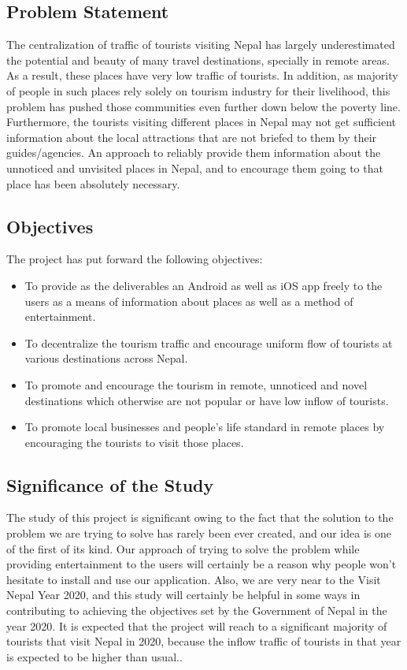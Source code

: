 \documentclass[12pt, a4paper, oneside]{article}
\begin{document}
\subsection{Problem Statement}
The centralization of traffic of tourists visiting Nepal has largely underestimated the potential and beauty of many travel destinations, specially in remote areas. As a result, these places have very low traffic of tourists. In addition, as majority of people in such places rely solely on tourism industry for their livelihood, this problem has pushed those communities even further down below the poverty line. Furthermore, the tourists visiting different places in Nepal may not get sufficient information about the local attractions that are not briefed to them by their guides/agencies. An approach to reliably provide them information about the unnoticed and unvisited places in Nepal, and to encourage them going to that place has been absolutely necessary.

\subsection{Objectives}
The project has put forward the following objectives:

\begin{itemize}
	\item To provide as the deliverables an Android as well as iOS app freely to the users as a means of information about places as well as a method of entertainment.
	\item To decentralize the tourism traffic and encourage uniform flow of tourists at various destinations across Nepal.
	\item To promote and encourage the tourism in remote, unnoticed and novel destinations which otherwise are not popular or have low inflow of tourists.
	\item To promote local businesses and people's life standard in remote places by encouraging the tourists to visit those places.
\end{itemize}

\subsection{Significance of the Study}
The study of this project is significant owing to the fact that the solution to the problem we are trying to solve has rarely been ever created, and our idea is one of the first of its kind. Our approach of trying to solve the problem while providing entertainment to the users will certainly be a reason why people won't hesitate to install and use our application. Also, we are very near to the Visit Nepal Year 2020, and this study will certainly be helpful in some ways in contributing to achieving the objectives set by the Government of Nepal in the year 2020. It is expected that the project will reach to a significant majority of tourists that visit Nepal in 2020, because the inflow traffic of tourists in that year is expected to be higher than usual..
\end{document}
